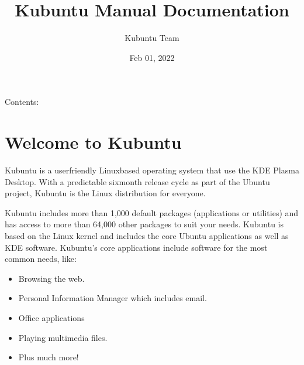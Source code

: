 \documentclass[letterpaper,10pt,english]{sphinxmanual}
\title{Kubuntu Manual Documentation}
\date{Feb 01, 2022}
\author{Kubuntu Team}
\begin{document}
\pagestyle{empty}
\sphinxmaketitle
\pagestyle{plain}
\sphinxtableofcontents
\pagestyle{normal}
\label{\detokenize{index::doc}}


\sphinxAtStartPar
Contents:


\chapter{Welcome to Kubuntu}
\label{\detokenize{welcome:welcome-to-kubuntu}}\label{\detokenize{welcome::doc}}

\sphinxAtStartPar
Kubuntu is a user\sphinxhyphen{}friendly Linux\sphinxhyphen{}based operating system that use the KDE Plasma Desktop. With a predictable
six\sphinxhyphen{}month release cycle as part of the Ubuntu project, Kubuntu is the Linux distribution for everyone.

\sphinxAtStartPar
Kubuntu includes more than 1,000 default packages (applications or utilities) and has access to more than 64,000 other packages to suit your needs. Kubuntu is based on the Linux kernel and includes the core Ubuntu applications as well as KDE software. Kubuntu’s core applications include software for the most common needs, like:
\begin{itemize}
\item {} 
\sphinxAtStartPar
Browsing the web.

\item {} 
\sphinxAtStartPar
Personal Information Manager which includes email.

\item {} 
\sphinxAtStartPar
Office applications

\item {} 
\sphinxAtStartPar
Playing multimedia files.

\item {} 
\sphinxAtStartPar
Plus much more!

\end{itemize}
\end{document}
